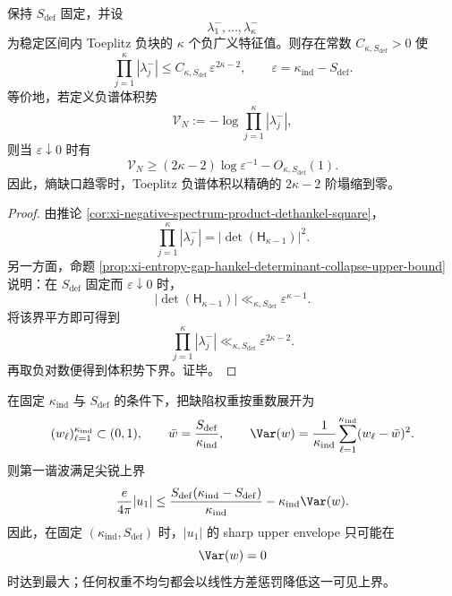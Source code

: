 \begin{theorem}\label{thm:derived-negative-spectrum-volume-potential-collapse}
保持 \(S_{\mathrm{def}}\) 固定，并设
\[
\lambda^-_1,\dots,\lambda^-_\kappa
\]
为稳定区间内 Toeplitz 负块的 \(\kappa\) 个负广义特征值。则存在常数 \(C_{\kappa,S_{\mathrm{def}}}>0\) 使
\[
\prod_{j=1}^{\kappa}|\lambda^-_j|
\le
C_{\kappa,S_{\mathrm{def}}}\,\varepsilon^{2\kappa-2},
\qquad
\varepsilon=\kappa_{\mathrm{ind}}-S_{\mathrm{def}}.
\]
等价地，若定义负谱体积势
\[
\mathcal V_N:=
-\log\prod_{j=1}^{\kappa}|\lambda^-_j|,
\]
则当 \(\varepsilon\downarrow 0\) 时有
\[
\mathcal V_N\ge (2\kappa-2)\log \varepsilon^{-1}-O_{\kappa,S_{\mathrm{def}}}(1).
\]
因此，熵缺口趋零时，Toeplitz 负谱体积以精确的 \(2\kappa-2\) 阶塌缩到零。
\end{theorem}

\begin{proof}
由推论 \ref{cor:xi-negative-spectrum-product-dethankel-square}，
\[
\prod_{j=1}^{\kappa}|\lambda^-_j|
=
\bigl|\det(\mathsf H_{\kappa-1})\bigr|^2.
\]
另一方面，命题 \ref{prop:xi-entropy-gap-hankel-determinant-collapse-upper-bound} 说明：在 \(S_{\mathrm{def}}\) 固定而 \(\varepsilon\downarrow 0\) 时，
\[
\bigl|\det(\mathsf H_{\kappa-1})\bigr|
\ll_{\kappa,S_{\mathrm{def}}}
\varepsilon^{\kappa-1}.
\]
将该界平方即可得到
\[
\prod_{j=1}^{\kappa}|\lambda^-_j|
\ll_{\kappa,S_{\mathrm{def}}}
\varepsilon^{2\kappa-2}.
\]
再取负对数便得到体积势下界。证毕。
\end{proof}

\begin{proposition}[第一谐波的方差惩罚与均匀权重的极值包络]\label{prop:derived-first-harmonic-variance-penalty-envelope}
在固定 \(\kappa_{\mathrm{ind}}\) 与 \(S_{\mathrm{def}}\) 的条件下，把缺陷权重按重数展开为
\[
(w_\ell)_{\ell=1}^{\kappa_{\mathrm{ind}}}\subset (0,1),
\qquad
\bar w=\frac{S_{\mathrm{def}}}{\kappa_{\mathrm{ind}}},
\qquad
\Var(w)=\frac1{\kappa_{\mathrm{ind}}}\sum_{\ell=1}^{\kappa_{\mathrm{ind}}}(w_\ell-\bar w)^2.
\]
则第一谐波满足尖锐上界
\[
\frac{e}{4\pi}|u_1|
\le
\frac{S_{\mathrm{def}}(\kappa_{\mathrm{ind}}-S_{\mathrm{def}})}{\kappa_{\mathrm{ind}}}
-\kappa_{\mathrm{ind}}\Var(w).
\]
因此，在固定 \((\kappa_{\mathrm{ind}},S_{\mathrm{def}})\) 时，\(|u_1|\) 的 sharp upper envelope 只可能在
\[
\Var(w)=0
\]
时达到最大；任何权重不均匀都会以线性方差惩罚降低这一可见上界。
\end{proposition}

